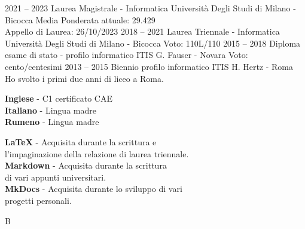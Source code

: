 \documentclass[9pt]{developercv} %
\begin{document}


\begin{entrylist}
	\entry
		{2021 -- 2023}
		{Laurea Magistrale - Informatica}
		{Università Degli Studi di Milano - Bicocca}
		{Media Ponderata attuale: 29.429\\Appello di Laurea: 26/10/2023}
	\entry
		{2018 -- 2021}
		{Laurea Triennale - Informatica}
		{Università Degli Studi di Milano - Bicocca}
		{Voto: 110L/110}
	\entry
		{2015 -- 2018}
		{Diploma esame di stato - profilo informatico}
		{ITIS G. Fauser - Novara}
		{Voto: cento/centesimi}
	\entry
		{2013 -- 2015}
		{Biennio profilo informatico}
		{ITIS H. Hertz - Roma}
		{Ho svolto i primi due anni di liceo a Roma.}
\end{entrylist}


\begin{minipage}[t]{0.27\textwidth}
	\vspace{-\baselineskip} %

	
	\textbf{Inglese} - C1 certificato CAE\\
	\textbf{Italiano} - Lingua madre\\
	\textbf{Rumeno} - Lingua madre
\end{minipage}
\hfill
\begin{minipage}[t]{0.43\textwidth}
	\vspace{-\baselineskip} %
	
	
	\textbf{LaTeX} - Acquisita durante la scrittura e \\l'impaginazione della relazione di laurea triennale.\\
	\textbf{Markdown} - Acquisita durante la scrittura\\ di vari appunti universitari.\\
	\textbf{MkDocs} - Acquisita durante lo sviluppo di vari\\progetti personali.
	
\end{minipage}
\hfill
\begin{minipage}[t]{0.2\textwidth}
	\vspace{-\baselineskip} %
	
	
	B
\end{minipage}
\end{document}
